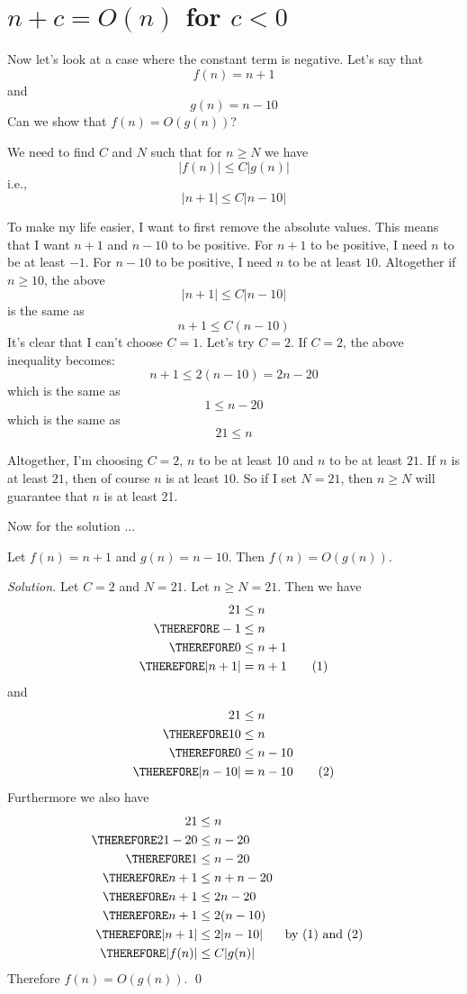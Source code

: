 \section{$n + c = O(n)$ for $c < 0$}
Now let's look at a case where the constant term is negative.
Let's say that 
\[
f(n) = n + 1
\]
and 
\[
g(n) = n - 10
\]
Can we show that $f(n) = O(g(n))$?

We need to find $C$ and $N$ such that for $n \geq N$ we have
\[
|f(n)| \leq C|g(n)|
\]
i.e.,
\[
|n + 1| \leq C|n - 10|
\]

To make my life easier, I want to first remove the absolute values.
This means that I want $n + 1$ and $n - 10$ to be positive.
For $n + 1$ to be positive, I need $n$ to be at least $-1$.
For $n - 10$ to be positive, I need $n$ to be at least $10$.
Altogether if $n \geq 10$, the above 
\[
|n + 1| \leq C|n - 10|
\]
is the same as 
\[
n + 1 \leq C(n - 10)
\]
It's clear that I can't choose $C = 1$.
Let's try $C = 2$.
If $C = 2$, the above inequality becomes:
\[
n + 1 \leq 2(n - 10) = 2n - 20
\]
which is the same as
\[
1 \leq n - 20
\]
which is the same as
\[
21 \leq n
\]

Altogether, I'm choosing $C = 2$, $n$ to be at least 10 and 
$n$ to be at least $21$.
If $n$ is at least $21$, then of course $n$ is at least $10$.
So if I set $N = 21$, then $n \geq N$ will guarantee that 
$n$ is at least 21.

Now for the solution ...


\begin{eg}
Let
$f(n) = n + 1$
and 
$g(n) = n - 10$.
Then $f(n) = O(g(n))$.
\end{eg}

\textit{Solution.}
Let $C = 2$ and $N = 21$.
Let $n \geq N = 21$.
Then we have
\begin{align*}
21 &\leq n \\
\THEREFORE -1 &\leq n \\
\THEREFORE 0 &\leq n + 1 \\
\THEREFORE |n + 1| &= n + 1 \tag{1}
\end{align*}
and
\begin{align*}
21 &\leq n \\
\THEREFORE 10 &\leq n \\
\THEREFORE 0 &\leq n - 10 \\
\THEREFORE |n - 10| &= n - 10 \tag{2}
\end{align*}
Furthermore we also have
\begin{align*}
21 &\leq n \\
\THEREFORE 21 - 20 &\leq n - 20 \\
\THEREFORE 1 &\leq n - 20 \\
\THEREFORE n + 1 &\leq n + n - 20 \\
\THEREFORE n + 1 &\leq 2n - 20 \\
\THEREFORE n + 1 &\leq 2(n - 10) \\
\THEREFORE |n + 1| &\leq 2|n - 10| & & \text{by (1) and (2)}\\
\THEREFORE |f(n)| &\leq C|g(n)| \\
\end{align*}
Therefore $f(n) = O(g(n))$. 
\qed

